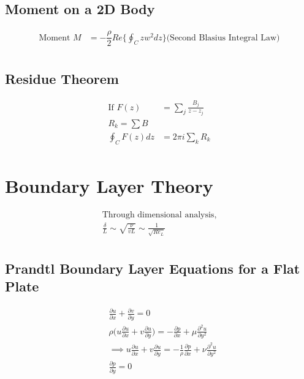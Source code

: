 \documentclass[11pt, letterpaper, notitlepage]{article}
\begin{document}
\subsection{Moment on a 2D Body}
\begin{align*}
\text{Moment } M &= -\dfrac{\rho}{2} Re \Biggl\{ \oint_{C}^{} z w^2 dz \Biggr\} \bigl(\text{Second Blasius Integral Law}\bigr) \\
\end{align*}

\subsection{Residue Theorem}
\begin{align*}
\text{If } F(z) &= \sum_{j}^{} \frac{B_j}{z - z_j} \\
R_k = \sum B \\
\oint_{C}^{} F(z) dz &= 2 \pi i \sum_{k}^{} R_k \\
\end{align*}

\newpage
\section{Boundary Layer Theory}
\begin{align*}
\text{Through dimensional analysis,} \\
\frac{\delta}{L} \sim \sqrt{\frac{\nu}{v L}} \sim \frac{1}{\sqrt{Re_L}} \\
\end{align*}

\subsection{Prandtl Boundary Layer Equations for a Flat Plate}
\begin{align*}
& \frac{\partial u}{\partial x} + \frac{\partial v}{\partial y} = 0 \\
& \rho \Biggl(u \frac{\partial u}{\partial x} + v \frac{\partial u}{\partial y} \Biggr) = -\frac{\partial p}{\partial x} + \mu \frac{{\partial}^2 u}{\partial y^2} \\
&\implies u \frac{\partial u}{\partial x} + v \frac{\partial u}{\partial y} = -\frac{1}{\rho} \frac{\partial p}{\partial x} + \nu \frac{{\partial}^2 u}{\partial y^2} \\
&\frac{\partial p}{\partial y} = 0
\end{align*}
\end{document}
